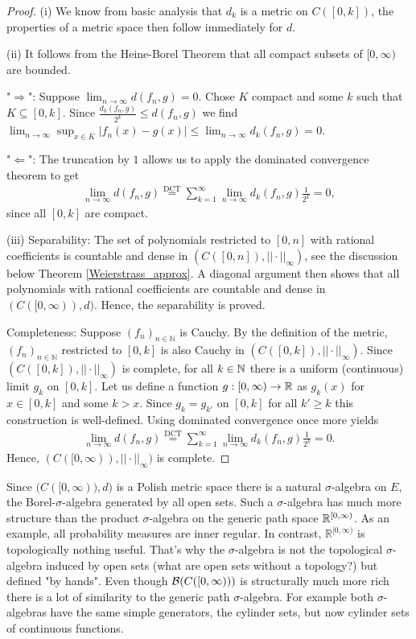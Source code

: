 \begin{proof}[Proof]
(i)	We know from basic analysis that $d_k$ is a metric on $C([0,k])$, the properties of a metric space then follow immediately for $d$.\smallskip

(ii) It follows from the Heine-Borel Theorem that all compact subsets of $[0,\infty)$ are bounded. \smallskip
		
		"$\Rightarrow$": Suppose $\lim_{n\to\infty} d(f_n,g)=0$. Chose $K$ compact and some $k$ such that $K\subseteq [0,k]$. Since $\frac{d_k(f_n,g)}{2^k}\leq d(f_n,g)$ we find $\lim_{n\to\infty}\sup_{x\in K}|f_n(x)-g(x)|\leq \lim_{n\to\infty}d_k(f_n,g)=0$.\smallskip
	
		"$\Leftarrow$": The truncation by $1$ allows us to apply the dominated convergence theorem to get
		\begin{align*}
			\lim_{n\to\infty}d(f_n,g) \overset{\text{DCT}}{=} \sum_{k=1}^{\infty} \lim_{n\to \infty} d_k(f_n,g)\frac{1}{2^k}=0,			
		\end{align*}
			since all $[0,k]$ are compact.\smallskip

		 (iii) Separability: The set of polynomials restricted to $[0,n]$ with rational coefficients is countable and dense in $( C([0,n]),||\cdot||_\infty)$, see the discussion below Theorem \ref{Weierstrass_approx}. A diagonal argument then shows that all polynomials with rational coefficients are countable and dense in $(C([0,\infty)), d \big)$. Hence, the separability is proved.\smallskip
		
		Completeness: Suppose $(f_n)_{n\in\mathbb{N}}$ is Cauchy. By the definition of the metric, $(f_n)_{n\in\mathbb{N}}$ restricted to $[0,k]$ is also Cauchy in $(C([0,k]),||\cdot||_\infty)$. Since $( C([0,k]), ||\cdot||_\infty)$ is complete, for all $k\in\mathbb{N}$ there is a uniform (continuous) limit $g_k$ on $[0,k]$. Let us define a function $g:[0,\infty)\to \mathbb{R}$ as $g_k(x)$ for $x\in [0,k]$ and some $k>x$. Since $g_k = g_{k'}$ on $[0,k]$ for all $k' \geq k$ this construction is well-defined. Using dominated convergence once more yields
		\begin{align*}
			\lim_{n\to\infty}d(f_n,g) \overset{\text{DCT}}{=} \sum_{k=1}^{\infty} \lim_{n\to\infty} d_k(f_n,g)\frac{1}{2^k} = 0.
		\end{align*}
		Hence, $( C([0,\infty)),||\cdot||_\infty)$ is complete.
\end{proof}
Since $\big( C([0,\infty)),d \big)$ is a Polish metric space there is a natural $\sigma$-algebra on $E$, the Borel-$\sigma$-algebra generated by all open sets. Such a $\sigma$-algebra has much more structure than the product $\sigma$-algebra on the generic path space $\mathbb{R}^{[0,\infty)}$. As an example, all probability measures are inner regular. In contrast, $\mathbb{R}^{[0,\infty)}$ is topologically nothing useful. That's why the $\sigma$-algebra is not the topological $\sigma$-algebra induced by open sets (what are open sets without a topology?) but defined "by hands". Even though $\mathcal{B}(C([0,\infty)))$ is structurally much more rich there is a lot of similarity to the generic path $\sigma$-algebra. For example both $\sigma$-algebras have the same simple generators, the cylinder sets, but now cylinder sets of continuous functions.
